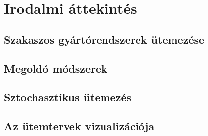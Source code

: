 \chapter{Irodalmi áttekintés}
\section{Szakaszos gyártórendszerek ütemezése}
\section{Megoldó módszerek}
\section{Sztochasztikus ütemezés}
\section{Az ütemtervek vizualizációja}